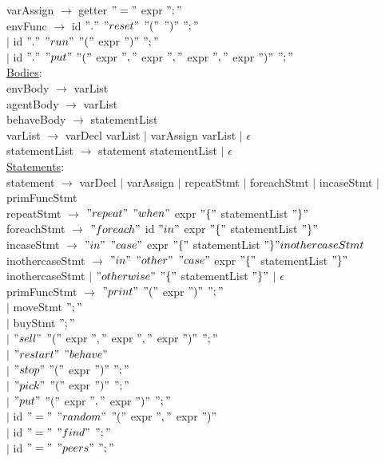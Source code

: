\documentclass{article}
\begin{document}
varAssign $\rightarrow$ getter $"="$ expr $";"$ \\

envFunc $\rightarrow$ id $"."$ $"reset"$ $"("$ $")"$ $";"$ \\
$\vert$ id $"."$ $"run"$ $"("$ expr $")"$ $";"$\\
$\vert$ id $"."$ $"put"$ $"("$ expr $","$ expr $","$ expr $","$ expr $")"$ $";"$\\

\underline{Bodies}: \\

envBody $\rightarrow$ varList \\

agentBody $\rightarrow$ varList \\

behaveBody $\rightarrow$ statementList \\

varList $\rightarrow$ varDecl varList $\vert$ varAssign varList $\vert$ $\epsilon$ \\

statementList $\rightarrow$ statement statementList $\vert$ $\epsilon$ \\

\underline{Statements}: \\

statement $\rightarrow$ varDecl $\vert$ varAssign $\vert$ repeatStmt $\vert$ foreachStmt $\vert$ incaseStmt $\vert$ primFuncStmt \\

repeatStmt $\rightarrow$ $"repeat"$ $"when"$ expr $"\{"$ statementList  $"\}"$ \\

foreachStmt $\rightarrow$ $"foreach"$ id $"in"$ expr $"\{"$ statementList  $"\}"$ \\

incaseStmt $\rightarrow$  $"in"$  $"case"$ expr $"\{"$ statementList  $"\}" inothercaseStmt$\\

inothercaseStmt $\rightarrow$  $"in"$ $"other"$  $"case"$ expr $"\{"$ statementList  $"\}"$ inothercaseStmt $\vert$ $"otherwise"$ $"\{"$ statementList  $"\}"$ $\vert$ $\epsilon$ \\  

primFuncStmt 
$\rightarrow$ $"print"$ $"("$ expr $")"$ $";"$ \\ 
$\vert$  moveStmt $";"$ \\
$\vert$ buyStmt $";"$ \\
$\vert$ $"sell"$ $"("$ expr $","$ expr $","$ expr $")"$ $";"$ \\
$\vert$ $"restart"$ $"behave"$ \\
$\vert$ $"stop"$ $"("$ expr $")"$ $";"$ \\
$\vert$ $"pick"$ $"("$ expr $")"$ $";"$ \\
$\vert$ $"put"$ $"("$ expr $","$ expr $")"$ $";"$ \\
$\vert$ id $"="$ $"random"$ $"("$ expr $","$ expr $")"$ \\
$\vert$ id $"="$ $"find"$ $";"$ \\
$\vert$ id $"="$ $"peers"$ $";"$\\
\end{document}
